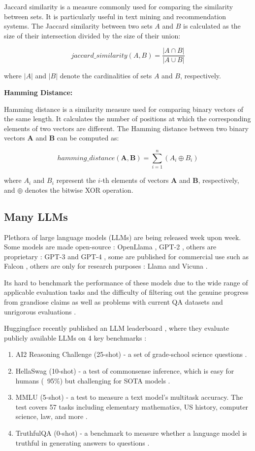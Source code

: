 \documentclass[a4paper,12pt]{article}
\begin{document}
Jaccard similarity \cite{jaccard} is a measure commonly used for comparing the similarity between sets. It is particularly useful in text mining and recommendation systems. The Jaccard similarity between two sets $A$ and $B$ is calculated as the size of their intersection divided by the size of their union:

$$
jaccard\_similarity(A, B) = \frac{|A \cap B|}{|A \cup B|}
$$

where $|A|$ and $|B|$ denote the cardinalities of sets $A$ and $B$, respectively.

\textbf{Hamming Distance:}

Hamming distance \cite{hamming} is a similarity measure used for comparing binary vectors of the same length. It calculates the number of positions at which the corresponding elements of two vectors are different. The Hamming distance between two binary vectors $\mathbf{A}$ and $\mathbf{B}$ can be computed as:

$$
hamming\_distance(\mathbf{A}, \mathbf{B}) = \sum_{i=1}^{n} (A_i \oplus B_i)
$$

where $A_i$ and $B_i$ represent the $i$-th elements of vectors $\mathbf{A}$ and $\mathbf{B}$, respectively, and $\oplus$ denotes the bitwise XOR operation.

\subsection{Many LLMs}
Plethora of large language models (LLMs) are being released week upon week. Some models are made open-source : OpenLlama \cite{openllama}, GPT-2 \cite{gpt2}, others are proprietary : GPT-3\cite{gpt3} and GPT-4 \cite{gpt4}, some are published for commercial use such as Falcon \cite{falcon}, others are only for research purposes : Llama \cite{llama} and Vicuna \cite{vicuna}.

Its hard to benchmark the performance of these models due to the wide range of applicable evaluation tasks and the difficulty of filtering out the genuine progress from grandiose claims as well as problems with current QA datasets and unrigorous evaluations \cite{unfairdataset}.

Huggingface recently published an LLM leaderboard \cite{open-llm-leaderboard}, where they evaluate publicly available LLMs on 4 key benchmarks : 

\begin{enumerate}
	\item AI2 Reasoning Challenge (25-shot) - a set of grade-school science questions \cite{AI2}.
	\item HellaSwag (10-shot) - a test of commonsense inference, which is easy for humans (~95\%) but challenging for SOTA models \cite{hellaswag}. 
	\item MMLU (5-shot) - a test to measure a text model’s multitask accuracy. The test covers 57 tasks including elementary mathematics, US history, computer science, law, and more \cite{MMLU}.
	\item TruthfulQA (0-shot) - a benchmark to measure whether a language model is truthful in generating answers to questions \cite{truthfulqa}.
\end{enumerate}
\end{document}
